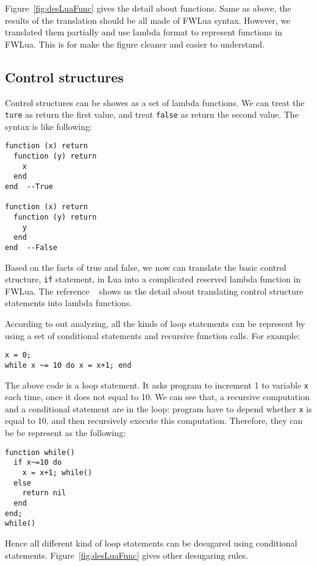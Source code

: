 Figure~\ref{fig:desLuaFunc} gives the detail about functions. Same as above, the results of the translation should be all made of FWLua syntax. However, we translated them partially and use lambda format to represent functions in FWLua. This is for make the figure cleaner and easier to understand.

\subsection{Control structures}
Control structures can be showes as a set of lambda functions. 
We can treat the {\tt ture} as return the first value, and treat {\tt false} as return the second value. The syntax is like following:

\begin{verbatim}
function (x) return 
  function (y) return 
    x
  end
end  --True

function (x) return 
  function (y) return 
    y
  end
end  --False
\end{verbatim}

Based on the facts of true and false, we now can translate the basic control structure, {\tt if} statement, in Lua into a complicated reserved lambda function in FWLua. The reference ~\cite{TAPL} shows us the detail about translating control structure statements into lambda functions.

According to out analyzing, all the kinds of loop statements can be represent by using a set of conditional statements and recursive function calls. For example:

\begin{verbatim}
x = 0;
while x ~= 10 do x = x+1; end
\end{verbatim}

The above code is a loop statement. It asks program to increment 1 to variable {\tt x} each time, once it does not equal to 10. We can see that, a recursive computation and a conditional statement are in the loop: program have to depend whether {\tt x} is equal to 10, and then recursively execute this computation. Therefore, they can be be represent as the following:

\begin{verbatim}
function while()
  if x~=10 do
    x = x+1; while()
  else
    return nil
  end
end;
while()
\end{verbatim}

Hence all different kind of loop statements can be desugared using conditional statements. Figure~\ref{fig:desLuaFunc} gives other desugaring rules.

